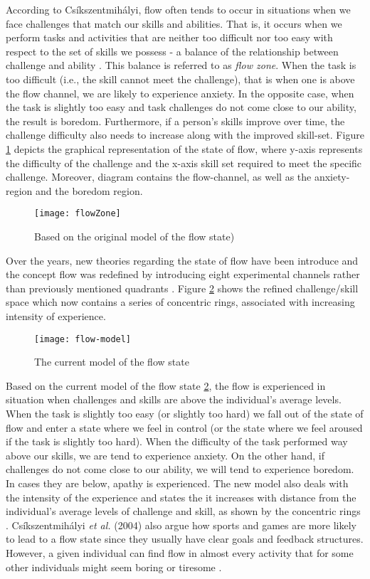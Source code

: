 According to Cs\'{i}kszentmih\'{a}lyi, flow often tends to occur in situations when we face challenges that match our skills and abilities. That is, it occurs when we perform tasks and activities that are neither too difficult nor too easy with respect to the set of skills we possess - a balance of the relationship between challenge and ability \cite{csikszentmihalyi1997finding, flow1990psychology, csikszentmihalyi1996flow}. This balance is referred to as \textit{flow zone}. When the task is too difficult (i.e., the skill cannot meet the challenge), that is when one is above the flow channel, we are likely to experience anxiety. In the opposite case, when the task is slightly too easy and task challenges do not come close to our ability, the result is boredom. Furthermore, if a person's skills improve over time, the challenge difficulty also needs to increase along with the improved skill-set. Figure \ref{fig:flowZone} depicts the graphical representation of the state of flow, where y-axis represents the difficulty of the challenge and the x-axis skill set required to meet the specific challenge. Moreover, diagram contains the flow-channel, as well as the anxiety-region and the boredom region. 
\begin{figure}[h]
    \centering
    \texttt{[image: flowZone]}
    \caption{Based on the original model of the flow state)}
    \label{fig:flowZone}
\end{figure}
Over the years, new theories regarding the state of flow have been introduce and the concept flow was redefined by introducing eight experimental channels rather than previously mentioned quadrants \cite{nakamura2014concept}. Figure \ref{fig:flowModel} shows the refined challenge/skill space which now contains a series of concentric rings, associated with increasing intensity of experience.
\begin{figure}[h]
    \centering
    \texttt{[image: flow-model]}
    \caption{The current model of the flow state \cite{nakamura2014concept}}
    \label{fig:flowModel}
\end{figure}
Based on the current model of the flow state \ref{fig:flowModel}, the flow is experienced in situation when challenges and
skills are above the individual's average levels. When the task is slightly too easy (or slightly too hard) we fall out of the state of flow and enter a state where we feel in control (or the state where we feel aroused if the task is slightly too hard). When the difficulty of the task performed way above our skills, we are tend to experience anxiety. On the other hand, if challenges do not come close to our ability, we will tend to experience boredom. In cases they are below, apathy is experienced. The new model also deals with the intensity of the experience and states the it increases with distance from the individual's average levels of challenge and skill, as shown by the concentric rings \cite{nakamura2014concept}.
Cs\'{i}kszentmih\'{a}lyi \textit{et al.} (2004) also argue how sports and games are more likely to lead to a flow state since they usually have clear goals and feedback structures. However, a given individual can find flow in almost every activity that for some other individuals might seem boring or tiresome \cite{csikszentmihalyi2014flow}.
